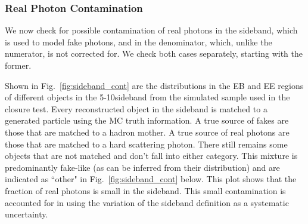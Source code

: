 \subsubsection{Real Photon Contamination}

We now check for possible contamination of real photons in the sideband, which is used to model fake photons, and in the denominator, which, unlike the numerator, is not corrected for. We check both cases separately, starting with the former.

Shown in Fig.~\ref{fig:sideband_cont} are the \sieie distributions in the EB and EE regions of different objects in the 5-10\GeV sideband from the simulated sample used in the closure test. Every reconstructed object in the sideband is matched to a generated particle using the MC truth information. A true source of fakes are those that are matched to a hadron mother. A true source of real photons are those that are matched to a hard scattering photon. There still remains some objects that are not matched and don't fall into either category. This mixture is predominantly fake-like (as can be inferred from their \sieie distribution) and are indicated as ``other" in Fig.~\ref{fig:sideband_cont} below. This plot shows that the fraction of real photons is small in the sideband. This small contamination is accounted for in using the variation of the sideband definition as a systematic uncertainty.

